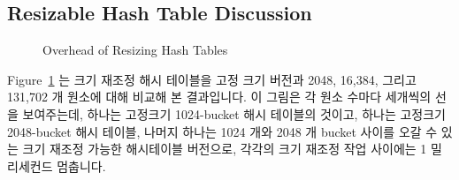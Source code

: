 \subsection{Resizable Hash Table Discussion}
\label{sec:datastruct:Resizable Hash Table Discussion}

\begin{figure}[tb]
\centering
{}
\caption{Overhead of Resizing Hash Tables}
\label{fig:datastruct:Overhead of Resizing Hash Tables}
\end{figure}

Figure~\ref{fig:datastruct:Overhead of Resizing Hash Tables}
는 크기 재조정 해시 테이블을 고정 크기 버전과 2048, 16,384, 그리고 131,702 개
원소에 대해 비교해 본 결과입니다.
이 그림은 각 원소 수마다 세개씩의 선을 보여주는데, 하나는 고정크기 1024-bucket
해시 테이블의 것이고, 하나는 고정크기 2048-bucket 해시 테이블, 나머지 하나는
1024 개와 2048 개 bucket 사이를 오갈 수 있는 크기 재조정 가능한 해시테이블
버전으로, 각각의 크기 재조정 작업 사이에는 1 밀리세컨드 멈춥니다.

